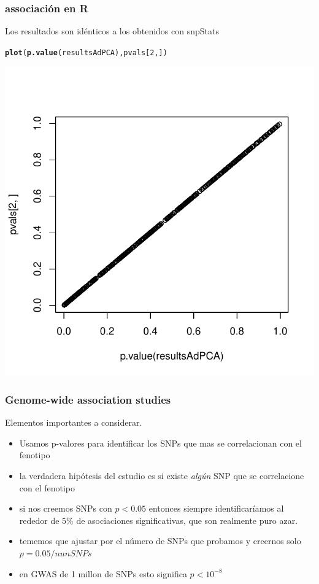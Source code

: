 \documentclass{beamer}\usepackage[]{graphicx}\usepackage[]{color}
\makeatletter
\newcommand{\hlnum}[1]{\textcolor[rgb]{0.686,0.059,0.569}{#1}}%
\newcommand{\hlstd}[1]{\textcolor[rgb]{0.345,0.345,0.345}{#1}}%
\newcommand{\hlkwd}[1]{\textcolor[rgb]{0.737,0.353,0.396}{\textbf{#1}}}%
\newenvironment{kframe}{%
 \def\at@end@of@kframe{}%
 \ifinner\ifhmode%
  \def\at@end@of@kframe{\end{minipage}}%
  \begin{minipage}{\columnwidth}%
 \fi\fi%
 \def\FrameCommand##1{\hskip\@totalleftmargin \hskip-\fboxsep
 \colorbox{shadecolor}{##1}\hskip-\fboxsep
     \hskip-\linewidth \hskip-\@totalleftmargin \hskip\columnwidth}%
 \MakeFramed {\advance\hsize-\width
   \@totalleftmargin\z@ \linewidth\hsize
   \@setminipage}}%
 {\par\unskip\endMakeFramed%
 \at@end@of@kframe}
\newenvironment{knitrout}{}{} %
\makeatother
\begin{document}
\begin{frame}[fragile]
\frametitle{associaci\'on en R}
Los resultados son id\'enticos a los obtenidos con snpStats

\begin{knitrout}\footnotesize
{}\color{fgcolor}\begin{kframe}
\begin{alltt}
\hlkwd{plot}\hlstd{(}\hlkwd{p.value}\hlstd{(resultsAdPCA), pvals[}\hlnum{2}\hlstd{,])}
\end{alltt}
\end{kframe}
\includegraphics[width=.45\linewidth]{figure/plot5-1} 

\end{knitrout}
\end{frame}


\begin{frame}[fragile]
\frametitle{Genome-wide association studies}
Elementos importantes a considerar.

\begin{itemize}
\item Usamos p-valores para identificar los SNPs que mas se correlacionan con el fenotipo
\item la verdadera hip\'otesis del estudio es si existe \emph{alg\'un} SNP que se correlacione con el fenotipo
\item si nos creemos SNPs con $p<0.05$ entonces siempre identificar\'iamos al rededor de $5\%$ de asociaciones significativas, que son realmente puro azar. 
\item tememos que ajustar por el n\'umero de SNPs que probamos y creernos solo $p=0.05/nunSNPs$
\item en GWAS de 1 millon de SNPs esto significa  $p<10^{-8} $
\end{itemize}

\end{frame}
\end{document}
